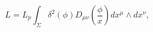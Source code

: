 \begin{equation}
L=L_p\int_\Sigma \delta ^2(\phi )D_{\mu \nu }\left( \frac{\phi}{x}
\right) dx^\mu \wedge dx^\nu ,  \label{L}
\end{equation}

